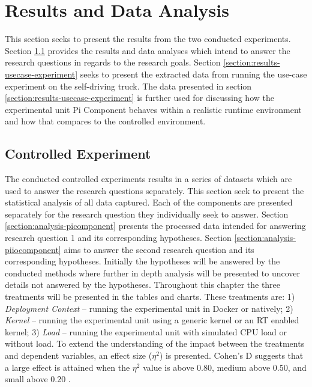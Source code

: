 \iffalse  \fi
\chapter{Results and Data Analysis}\label{section:data-analysis}

This section seeks to present the results from the two conducted experiments. Section \ref{section:results-controlled-experiment} provides the results and data analyses which intend to answer the research questions in regards to the research goals. Section \ref{section:results-usecase-experiment} seeks to present the extracted data from running the use-case experiment on the self-driving truck. The data presented in section \ref{section:results-usecase-experiment} is further used for discussing how the experimental unit Pi Component behaves within a realistic runtime environment and how that compares to the controlled environment.\\

\section{Controlled Experiment}
\label{section:results-controlled-experiment}

The conducted controlled experiments results in a series of datasets which are used to answer the research questions separately. This section seek to present the statistical analysis of all data captured. Each of the components are presented separately for the research question they individually seek to answer. Section \ref{section:analysis-picomponent} presents the processed data intended for answering research question 1 and its corresponding hypotheses. Section \ref{section:analysis-piiocomponent} aims to answer the second research question and its corresponding hypotheses. Initially the hypotheses will be answered by the conducted methods where further in depth analysis will be presented to uncover details not answered by the hypotheses. Throughout this chapter the three treatments will be presented in the tables and charts. These treatments are: 1) \textit{Deployment Context} – running the experimental unit in Docker or natively; 2) \textit{Kernel} – running the experimental unit using a generic kernel or an RT enabled kernel; 3) \textit{Load} – running the experimental unit with simulated CPU load or without load. To extend the understanding of the impact between the treatments and dependent variables, an effect size ($\eta^{2}$) is presented. Cohen's D suggests that a large effect is attained when the $\eta^{2}$ value is above 0.80, medium above 0.50, and small above 0.20 \cite{jackson2013statistics}.

